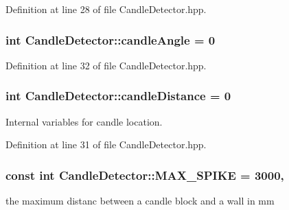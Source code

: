 Definition at line 28 of file Candle\-Detector.\-hpp.

\hypertarget{classCandleDetector_a043c3f35890b36e187734a492f96f84c}{
\subsubsection[{candle\-Angle}]{\setlength{\rightskip}{0pt plus 5cm}int Candle\-Detector\-::candle\-Angle = 0\hspace{0.3cm}{\ttfamily [private]}}}\label{classCandleDetector_a043c3f35890b36e187734a492f96f84c}


Definition at line 32 of file Candle\-Detector.\-hpp.

\hypertarget{classCandleDetector_a3d4f2c951c77838bfc5c068b58cf9fda}{
\subsubsection[{candle\-Distance}]{\setlength{\rightskip}{0pt plus 5cm}int Candle\-Detector\-::candle\-Distance = 0\hspace{0.3cm}{\ttfamily [private]}}}\label{classCandleDetector_a3d4f2c951c77838bfc5c068b58cf9fda}


Internal variables for candle location. 



Definition at line 31 of file Candle\-Detector.\-hpp.

\hypertarget{classCandleDetector_a3903cd4085162f1fc38ca74cac3b954e}{
\subsubsection[{M\-A\-X\-\_\-\-S\-P\-I\-K\-E}]{\setlength{\rightskip}{0pt plus 5cm}const int Candle\-Detector\-::\-M\-A\-X\-\_\-\-S\-P\-I\-K\-E = 3000\hspace{0.3cm}{\ttfamily [static]}, {\ttfamily [private]}}}\label{classCandleDetector_a3903cd4085162f1fc38ca74cac3b954e}


the maximum distanc between a candle block and a wall in mm 



